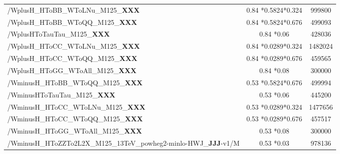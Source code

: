 \begin{table}
\begin{adjustbox}{max width=\textwidth}
\begin{tabular}{lcc}
 /WplusH\_HToBB\_WToLNu\_M125\_{\bf{XXX}}                            & 0.84  *0.5824*0.324                    &999800    \\
 /WplusH\_HToBB\_WToQQ\_M125\_{\bf{XXX}}                             & 0.84  *0.5824*0.676                    &499093    \\
 /WplusHToTauTau\_M125\_{\bf{XXX}}                                   & 0.84  *0.06                            &428036    \\
 /WplusH\_HToCC\_WToLNu\_M125\_{\bf{XXX}}                            & 0.84  *0.0289*0.324                    &1482024   \\
 /WplusH\_HToCC\_WToQQ\_M125\_{\bf{XXX}}                             & 0.84  *0.0289*0.676                    &459565    \\
 /WplusH\_HToGG\_WToAll\_M125\_{\bf{XXX}}                            & 0.84  *0.08                            &300000    \\\hline
                                                                                                                                                   
 /WminusH\_HToBB\_WToQQ\_M125\_{\bf{XXX}}                            & 0.53  *0.5824*0.676                    &499994    \\
 /WminusHToTauTau\_M125\_{\bf{XXX}}                                  & 0.53  *0.06                            &445200    \\
 /WminusH\_HToCC\_WToLNu\_M125\_{\bf{XXX}}                           & 0.53  *0.0289*0.324                    &1477656   \\
 /WminusH\_HToCC\_WToQQ\_M125\_{\bf{XXX}}                            & 0.53  *0.0289*0.676                    &457517    \\
 /WminusH\_HToGG\_WToAll\_M125\_{\bf{XXX}}                           & 0.53  *0.08                            &300000    \\
 /WminusH\_HToZZTo2L2X\_M125\_13TeV\_powheg2-minlo-HWJ\_{\bf{JJJ}}-v1/M   & 0.53  *0.03                            &978136    \\\hline
                                                                                                                                                   

\end{tabular}
\end{adjustbox}
\end{table}
